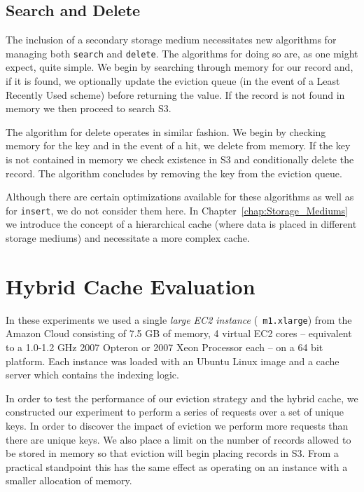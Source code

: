 
\subsection{Search and Delete} %
\label{sub:hybrid_search_delete}
The inclusion of a secondary storage medium necessitates new algorithms for
managing both {\tt search} and {\tt delete}. The algorithms for doing so are,
as one might expect, quite simple. We begin by searching through memory for our
record and, if it is found, we optionally update the eviction queue (\eg in the
event of a Least Recently Used scheme) before returning the value. If the
record is not found in memory we then proceed to search S3.

The algorithm for delete operates in similar fashion. We begin by checking
memory for the key and in the event of a hit, we delete from memory. If the key
is not contained in memory we check existence in S3 and conditionally delete
the record. The algorithm concludes by removing the key from the eviction
queue.

Although there are certain optimizations available for these algorithms as well
as for {\tt insert}, we do not consider them here. In
Chapter~\ref{chap:Storage_Mediums} we introduce the concept of a hierarchical
cache (where data is placed in different storage mediums) and necessitate a
more complex cache.



\section{Hybrid Cache Evaluation} %
\label{sub:hybrid_system_evaluation}
In these experiments we used a single \emph{large EC2 instance} ({\tt
m1.xlarge}) from the Amazon Cloud consisting of 7.5 GB of memory, 4 virtual EC2
cores -- equivalent to a 1.0-1.2 GHz 2007 Opteron or 2007 Xeon Processor each
-- on a 64 bit platform.  Each instance was loaded with an Ubuntu Linux image
and a cache server which contains the indexing logic.

In order to test the performance of our eviction strategy and the hybrid cache,
we constructed our experiment to perform a series of requests over a set of
unique keys. In order to discover the impact of eviction we perform more
requests than there are unique keys. We also place a limit on the number of
records allowed to be stored in memory so that eviction will begin placing
records in S3. From a practical standpoint this has the same effect as
operating on an instance with a smaller allocation of memory.


